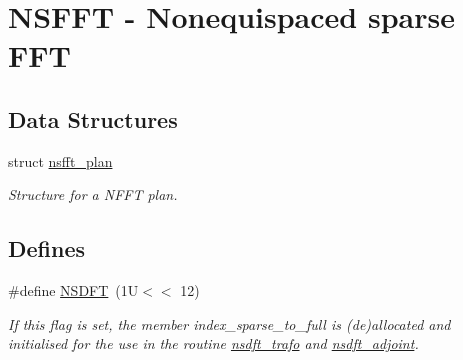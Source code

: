 \hypertarget{group__nsfft}{
\section{NSFFT - Nonequispaced sparse FFT}
\label{group__nsfft}
}
\subsection*{Data Structures}
\begin{CompactItemize}
\item 
struct \hyperlink{structnsfft__plan}{nsfft\_\-plan}
\begin{CompactList}\small\item\em Structure for a NFFT plan. \item\end{CompactList}\end{CompactItemize}
\subsection*{Defines}
\begin{CompactItemize}
\item 
\#define \hyperlink{group__nsfft_g3a5a1f8be42adf0575f0e0c4b8e0a32a}{NSDFT}~(1U$<$$<$ 12)
\begin{CompactList}\small\item\em If this flag is set, the member index\_\-sparse\_\-to\_\-full is (de)allocated and initialised for the use in the routine \hyperlink{group__nsfft_gd7ab4bcc35ad74e32af2abe42bc9e7f3}{nsdft\_\-trafo} and \hyperlink{group__nsfft_ge287757bca5164f2e5db7fe92ae1df13}{nsdft\_\-adjoint}. \item\end{CompactList}\end{CompactItemize}

